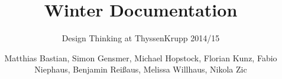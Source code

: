 \documentclass[graybox,envcountchap,sectrefs]{svmono}
\begin{document}
\author{Matthias Bastian, Simon Gensmer, Michael Hopstock, Florian Kunz, Fabio Niephaus, Benjamin Reißaus, Melissa Willhaus, Nikola Zic}
\title{Winter Documentation}
\subtitle{Design Thinking at ThyssenKrupp 2014/15}
\maketitle

\frontmatter%




\tableofcontents




\mainmatter%






\backmatter%


\printindex

\end{document}
